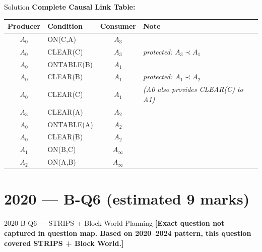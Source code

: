 \documentclass[12pt,a4paper]{article}
\begin{document}
\begin{solbox}{Solution}
\bigskip
\textbf{Complete Causal Link Table:}
\begin{center}
\begin{tabular}{clcl}
\toprule
\textbf{Producer} & \textbf{Condition} & \textbf{Consumer} & \textbf{Note} \\
\midrule
$A_0$ & ON(C,A) & $A_3$ & \\
$A_0$ & CLEAR(C) & $A_3$ & \emph{protected: $A_3 \prec A_1$} \\
$A_0$ & ONTABLE(B) & $A_1$ & \\
$A_0$ & CLEAR(B) & $A_1$ & \emph{protected: $A_1 \prec A_2$} \\
$A_0$ & CLEAR(C) & $A_1$ & \emph{(A0 also provides CLEAR(C) to A1)} \\
$A_3$ & CLEAR(A) & $A_2$ & \\
$A_0$ & ONTABLE(A) & $A_2$ & \\
$A_0$ & CLEAR(B) & $A_2$ & \\
$A_1$ & ON(B,C) & $A_\infty$ & \\
$A_2$ & ON(A,B) & $A_\infty$ & \\
\bottomrule
\end{tabular}
\end{center}
\end{solbox}

\newpage

\section{2020 --- B-Q6 (estimated 9 marks)}

\begin{qbox}{2020 B-Q6 --- STRIPS + Block World Planning}
\textbf{[Exact question not captured in question map.
Based on 2020--2024 pattern, this question covered STRIPS + Block World.]}
\end{qbox}
\end{document}
